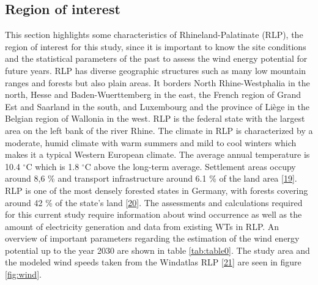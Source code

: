 \documentclass[a4paper,11pt]{article}
\begin{document}
\hypertarget{region-of-interest}{%
\subsection{Region of interest}\label{region-of-interest}}

This section highlights some characteristics of Rhineland-Palatinate (RLP), the region of interest for this study, since it is important to know the site conditions and the statistical parameters of the past to assess the wind energy potential for future years. RLP has diverse geographic structures such as many low mountain ranges and forests but also plain areas. It borders North Rhine-Westphalia in the north, Hesse and Baden-Wuerttemberg in the east, the French region of Grand Est and Saarland in the south, and Luxembourg and the province of Liège in the Belgian region of Wallonia in the west. RLP is the federal state with the largest area on the left bank of the river Rhine. The climate in RLP is characterized by a moderate, humid climate with warm summers and mild to cool winters which makes it a typical Western European climate. The average annual temperature is 10.4 \(^\circ\)C which is 1.8 \(^\circ\)C above the long-term average. Settlement areas occupy around 8,6 \% and transport infrastructure around 6.1 \% of the land area {[}\protect\hyperlink{ref-StateStatisticalOfficeofRhinelandPalatinate.2020}{19}{]}. RLP is one of the most densely forested states in Germany, with forests covering around 42 \% of the state's land {[}\protect\hyperlink{ref-HansenandLamour.2021}{20}{]}. The assessments and calculations required for this current study require information about wind occurrence as well as the amount of electricity generation and data from existing WTs in RLP. An overview of important parameters regarding the estimation of the wind energy potential up to the year 2030 are shown in table \ref{tab:table0}. The study area and the modeled wind speeds taken from the Windatlas RLP {[}\protect\hyperlink{ref-MinisteriumfurWirtschaftKlimaschutzEnergieundLandesplanung.2013}{21}{]} are seen in figure \ref{fig:wind}.
\end{document}
